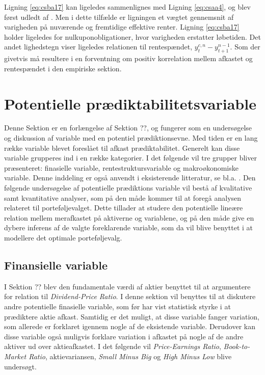 \documentclass[
  a4paper,
  oneside]{memoir}
\begin{document}
Ligning \eqref{eq:csba17} kan ligeledes sammenlignes med Ligning \eqref{eq:csaa4}, og blev først udledt af \citep{Campbell1983}. Men i dette tilfælde er ligningen et vægtet gennemsnit af varigheden på nuværende og fremtidige effektive renter. Ligning \eqref{eq:csba17} holder ligeledes for nulkuponobligationer, hvor varigheden erstatter løbetiden. Det andet lighedstegn viser ligeledes relationen til rentespændet, \(y_t^{c,n}- y_{t+1}^{n-1}\). Som der givetvis må resultere i en forventning om positiv korrelation mellem afkastet og rentespændet i den empiriske sektion.

\hypertarget{potentielle-pruxe6diktabilitetsvariable}{%
\section{Potentielle prædiktabilitetsvariable}\label{potentielle-pruxe6diktabilitetsvariable}}

Denne Sektion er en forlængelse af Sektion ??, og fungerer som en undersøgelse og diskussion af variable med en potentiel prædiktionsevne. Med tiden er en lang række variable blevet foreslået til afkast prædiktabilitet. Generelt kan disse variable grupperes ind i en række kategorier. I det følgende vil tre grupper bliver præsenteret: finasielle variable, rentestruktursvariable og makroøkonomiske variable. Denne inddeling er også anvendt i eksisterende litteratur, se bl.a. \citep{Koijen2011}. Den følgende undersøgelse af potentielle prædiktions variable vil bestå af kvalitative samt kvantitative analyser, som på den måde kommer til at foregå analysen relateret til porteføljevalget. Dette tillader at studere den potentielle lineære relation mellem merafkastet på aktiverne og variablene, og på den måde give en dybere inferens af de valgte foreklarende variable, som da vil blive benyttet i at modellere det optimale porteføljevalg.

\hypertarget{finansielle-variable}{%
\subsection{Finansielle variable}\label{finansielle-variable}}

I Sektion ?? blev den fundamentale værdi af aktier benyttet til at argumentere for relation til \emph{Dividend-Price Ratio}. I denne sektion vil benyttes til at diskutere andre potentielle finasielle variable, som før har vist statistisk styrke i at prædiktere aktie afkast. Samtidig er det muligt, at disse variable fanger variation, som allerede er forklaret igennem nogle af de eksistende variable. Derudover kan disse variable også muligvis forklare variation i afkastet på nogle af de andre aktiver ud over aktieafkastet. I det følgende vil \emph{Price-Earnings Ratio}, \emph{Book-to-Market Ratio}, aktievariansen, \emph{Small Minus Big} og \emph{High Minus Low} blive undersøgt.
\end{document}
